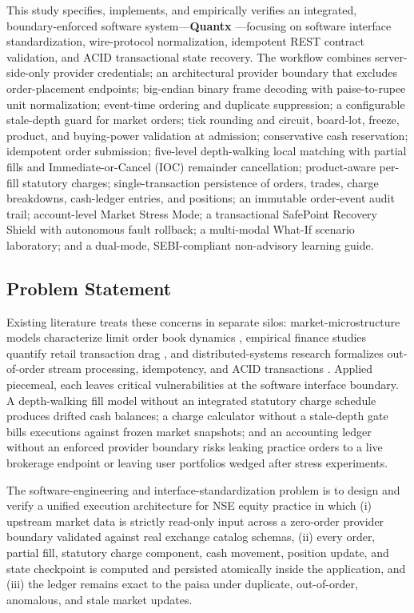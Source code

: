 \documentclass[journal,onecolumn,10pt]{IEEEtran}
\begin{document}
This study specifies, implements, and empirically verifies an integrated, boundary-enforced software system—\textbf{Quantx} \cite{quantx_software}—focusing on software interface standardization, wire-protocol normalization, idempotent REST contract validation, and ACID transactional state recovery. The workflow combines server-side-only provider credentials; an architectural provider boundary that excludes order-placement endpoints; big-endian binary frame decoding with paise-to-rupee unit normalization; event-time ordering and duplicate suppression; a configurable stale-depth guard for market orders; tick rounding and circuit, board-lot, freeze, product, and buying-power validation at admission; conservative cash reservation; idempotent order submission; five-level depth-walking local matching with partial fills and Immediate-or-Cancel (IOC) remainder cancellation; product-aware per-fill statutory charges; single-transaction persistence of orders, trades, charge breakdowns, cash-ledger entries, and positions; an immutable order-event audit trail; account-level Market Stress Mode; a transactional SafePoint Recovery Shield with autonomous fault rollback; a multi-modal What-If scenario laboratory; and a dual-mode, SEBI-compliant non-advisory learning guide.

\subsection{Problem Statement}
Existing literature treats these concerns in separate silos: market-microstructure models characterize limit order book dynamics \cite{gould2013,cont2010}, empirical finance studies quantify retail transaction drag \cite{barber2009,sebi2023}, and distributed-systems research formalizes out-of-order stream processing, idempotency, and ACID transactions \cite{akidau2015,helland2012,gray1993}. Applied piecemeal, each leaves critical vulnerabilities at the software interface boundary. A depth-walking fill model without an integrated statutory charge schedule produces drifted cash balances; a charge calculator without a stale-depth gate bills executions against frozen market snapshots; and an accounting ledger without an enforced provider boundary risks leaking practice orders to a live brokerage endpoint or leaving user portfolios wedged after stress experiments.

The software-engineering and interface-standardization problem is to design and verify a unified execution architecture for NSE equity practice in which (i) upstream market data is strictly read-only input across a zero-order provider boundary validated against real exchange catalog schemas, (ii) every order, partial fill, statutory charge component, cash movement, position update, and state checkpoint is computed and persisted atomically inside the application, and (iii) the ledger remains exact to the paisa under duplicate, out-of-order, anomalous, and stale market updates.
\end{document}
